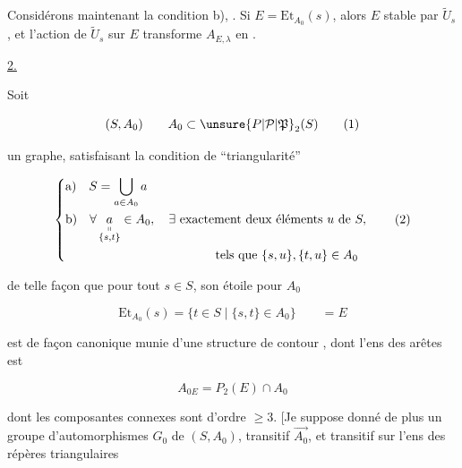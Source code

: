 

Considérons maintenant la condition b),  . Si $E=\mathrm{Et}_{A_0}(s)$, alors $E$  stable par $\widetilde U_s$, et l'action de $\widetilde U_s$ sur $E$ transforme $A_{E,\lambda}$ en .


\uline{2.}

Soit 

\[
 (S,A_0)\qquad A_0\subset\unsure{P|\mathcal P|\mathfrak P}_2(S) \tag*{(1)}
\]

un graphe, satisfaisant la condition de ``triangularité''

\[
\left\{\begin{aligned}
 &\text{a)}\quad S=\bigcup_{a\in A_0}a\\
 &\text{b)}\quad \forall\,\underset{\substack{\shortparallel\\\{s,t\}}}{a}\in A_0,\quad \exists\ \text{exactement deux éléments }u\text{ de }S,\\
 &\hspace{12em}\text{tels que }\{s,u\},\{t,u\}\in A_0
\end{aligned}\right. \tag*{(2)}
\]

 de telle façon que pour tout $s\in S$, son étoile pour $A_0$

\[
 \mathrm{Et}_{A_0}(s)=\{t\in S\mid\{s,t\}\in A_0\}\qquad =E \tag*{(3)}
\]

est de façon canonique munie d'une structure de contour  , dont l'ens des arêtes est

\[
 A_{0E}=P_2(E)\cap A_0 \tag*{(4)}
\]

dont les composantes connexes sont d'ordre $\geq 3$. [Je suppose donné de plus un groupe d'automorphismes
$G_0$ de $(S,A_0)$, transitif  $\overrightarrow{A_0}$, et  transitif sur l'ens des répères triangulaires

